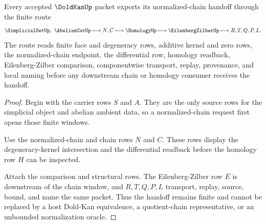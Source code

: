\begin{theorem}
\label{thm:dold-kan-normalized-chain-handoff}
Every accepted $\DoldKanUp$ packet exports its normalized-chain handoff through the finite route
$$
\SimplicialSetUp,\ \AbelianCatUp \longmapsto N,C \longmapsto \HomologyUp \longmapsto \EilenbergZilberUp \longmapsto R,T,Q,P,L .
$$
The route reads finite face and degeneracy rows, additive kernel and zero rows, the normalized-chain endpoint, the differential row, homology readback, Eilenberg-Zilber comparison, componentwise transport, replay, provenance, and local naming before any downstream chain or homology consumer receives the handoff.
\end{theorem}
\begin{proof}
Begin with the carrier rows $S$ and $A$. They are the only source rows for the simplicial object and abelian ambient data, so a normalized-chain request first opens those finite windows.

Use the normalized-chain and chain rows $N$ and $C$. These rows display the degeneracy-kernel intersection and the differential readback before the homology row $H$ can be inspected.

Attach the comparison and structural rows. The Eilenberg-Zilber row $E$ is downstream of the chain window, and $R,T,Q,P,L$ transport, replay, source, bound, and name the same packet. Thus the handoff remains finite and cannot be replaced by a host Dold-Kan equivalence, a quotient-chain representative, or an unbounded normalization oracle.
\end{proof}


\begin{closurestatus}{\DoldKanUp}
  \theoryclosure{\seedClosure}
  \formalstatus{\unformalizedV}
\end{closurestatus}
